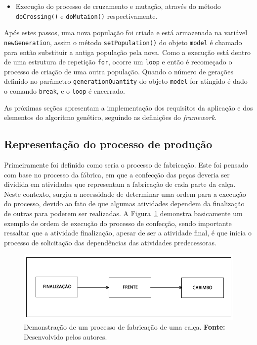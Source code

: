 \begin{itemize}
\begin{itemize}
		\item Execução do processo de cruzamento e mutação, através do método
		\texttt{doCrossing()} e \texttt{doMutaion()} respectivamente.
		
		
	\end{itemize}
	
	\par Após estes passos, uma nova população foi criada e está
	armazenada na variável \texttt{newGen\-eration}, assim o método
	\texttt{setPopulation()} do objeto \texttt{model} é chamado para então substituir
	a antiga população pela nova. Como a execução está dentro de uma estrutura de repetição
	\texttt{for}, ocorre um \texttt{loop} e então é recomeçado o processo de
	criação de uma outra população. Quando o número de gerações definido no parâmetro
	\texttt{generationQuantity} do objeto \texttt{model} for atingido é dado o comando 
	\texttt{break}, e o \texttt{loop} é encerrado.
	
	
	
\end{itemize}

\par As próximas seções apresentam a implementação dos requisitos da aplicação
e dos elementos do algoritmo genético, seguindo as definições do \textit{framework}.

\subsection{Representação do processo de produção}

\par Primeiramente foi definido como seria o processo de fabricação. Este foi pensado com base no 
processo da fábrica, em que a confecção das peças deveria ser dividida em atividades que representam a fabricação de
cada parte da calça. Neste contexto, surgiu a necessidade de determinar uma ordem para a execução do processo, 
devido ao fato de que algumas atividades dependem da finalização de outras para poderem ser
realizadas. A Figura~\ref{fig:processo_fabricacao} demonstra basicamente um
exemplo de ordem de execução do processo de confecção, sendo importante ressaltar que a atividade finalização, apesar
de ser a atividade final, é que inicia o processo de solicitação das dependências das atividades predecessoras.


\begin{figure}[h!]
	\centerline{\includegraphics[scale=0.5]{./imagens/processo1.png}}
	\caption[Demonstração de um processo de fabricação de uma calça.]
	{Demonstração de um processo de fabricação de uma calça. \textbf{Fonte:}
	Desenvolvido pelos autores.}
	\label{fig:processo_fabricacao}
\end{figure}

